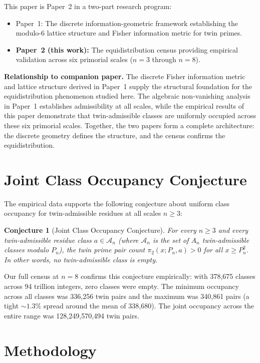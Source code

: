 \documentclass[11pt]{article}
\newtheorem{conjecture}{Conjecture}
\begin{document}
This paper is Paper~2 in a two-part research program:
\begin{itemize}
  \item Paper~1: The discrete information-geometric framework establishing the modulo-6 lattice structure and Fisher information metric for twin primes.
  \item \textbf{Paper~2 (this work):} The equidistribution census providing empirical validation across six primorial scales ($n=3$ through $n=8$).
\end{itemize}

\noindent\textbf{Relationship to companion paper.} The discrete Fisher information metric and lattice structure derived in Paper~1 supply the structural foundation for the equidistribution phenomenon studied here. The algebraic non-vanishing analysis in Paper~1 establishes admissibility at all scales, while the empirical results of this paper demonstrate that twin-admissible classes are uniformly occupied across these six primorial scales. Together, the two papers form a complete architecture: the discrete geometry defines the structure, and the census confirms the equidistribution.

\section{Joint Class Occupancy Conjecture}
\label{sec:occupancy}

The empirical data supports the following conjecture about uniform class occupancy for twin-admissible residues at all scales $n \geq 3$:

\begin{conjecture}[Joint Class Occupancy Conjecture]
\label{conj:joint}
For every $n \geq 3$ and every twin-admissible residue class $a \in \mathcal{A}_n$ (where $\mathcal{A}_n$ is the set of $A_n$ twin-admissible classes modulo $P_n$), the twin prime pair count $\pi_2(x; P_n, a) > 0$ for all $x \geq P_n^2$. In other words, no twin-admissible class is empty.
\end{conjecture}

\noindent Our full census at $n=8$ confirms this conjecture empirically: with 378{,}675 classes across 94 trillion integers, zero classes were empty. The minimum occupancy across all classes was 336{,}256 twin pairs and the maximum was 340{,}861 pairs (a tight $\sim 1.3\%$ spread around the mean of 338{,}680). The joint occupancy across the entire range was 128{,}249{,}570{,}494 twin pairs.

\section{Methodology}
\end{document}
